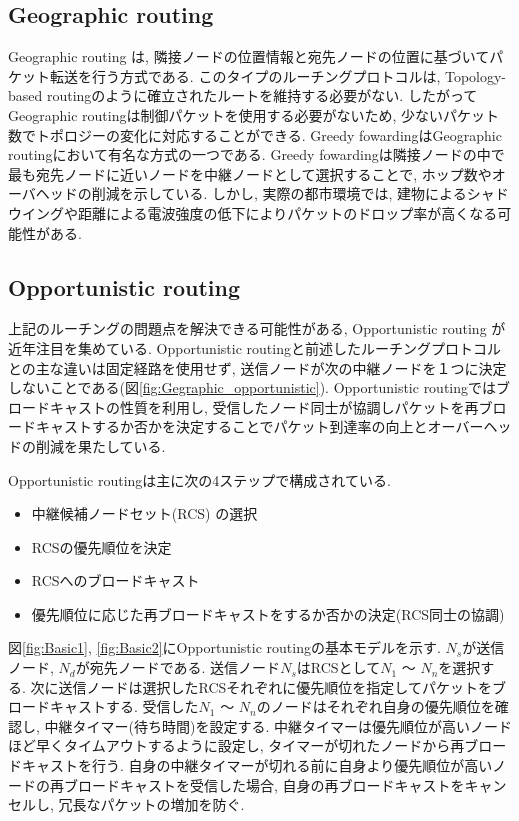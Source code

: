 \documentclass[10pt]{jreport}
\begin{document}
\subsection{Geographic routing}
\label{Geographic}
Geographic routing\cite{6,7,8,9,10,11,12,13,14,15} は, 隣接ノードの位置情報と宛先ノードの位置に基づいてパケット転送を行う方式である. このタイプのルーチングプロトコルは, Topology-based routingのように確立されたルートを維持する必要がない. したがってGeographic routingは制御パケットを使用する必要がないため, 少ないパケット数でトポロジーの変化に対応することができる. Greedy fowardingはGeographic routingにおいて有名な方式の一つである. Greedy fowardingは隣接ノードの中で最も宛先ノードに近いノードを中継ノードとして選択することで, ホップ数やオーバヘッドの削減を示している. しかし, 実際の都市環境では, 建物によるシャドウイングや距離による電波強度の低下によりパケットのドロップ率が高くなる可能性がある. 

\subsection{Opportunistic routing}
\label{Opportunistic}
上記のルーチングの問題点を解決できる可能性がある, Opportunistic routing\cite{16} が近年注目を集めている. Opportunistic routingと前述したルーチングプロトコルとの主な違いは固定経路を使用せず, 送信ノードが次の中継ノードを１つに決定しないことである(図\ref{fig:Gegraphic_opportunistic}). Opportunistic routingではブロードキャストの性質を利用し, 受信したノード同士が協調しパケットを再ブロードキャストするか否かを決定することでパケット到達率の向上とオーバーヘッドの削減を果たしている. 

Opportunistic routingは主に次の4ステップで構成されている.

\begin{itemize}
	\item 中継候補ノードセット(RCS) の選択
	\item RCSの優先順位を決定
	\item RCSへのブロードキャスト
	\item 優先順位に応じた再ブロードキャストをするか否かの決定(RCS同士の協調)
\end{itemize}

図\ref{fig:Basic1}, \ref{fig:Basic2}にOpportunistic routingの基本モデルを示す.
$N_{s}$が送信ノード, $N_{d}$が宛先ノードである. 送信ノード$N_{s}$はRCSとして$N_{1}$ ～ $N_{n}$を選択する. 次に送信ノードは選択したRCSそれぞれに優先順位を指定してパケットをブロードキャストする. 受信した$N_{1}$ ～ $N_{n}$のノードはそれぞれ自身の優先順位を確認し, 中継タイマー(待ち時間)を設定する. 中継タイマーは優先順位が高いノードほど早くタイムアウトするように設定し, タイマーが切れたノードから再ブロードキャストを行う. 自身の中継タイマーが切れる前に自身より優先順位が高いノードの再ブロードキャストを受信した場合, 自身の再ブロードキャストをキャンセルし, 冗長なパケットの増加を防ぐ.
 
\end{document}
